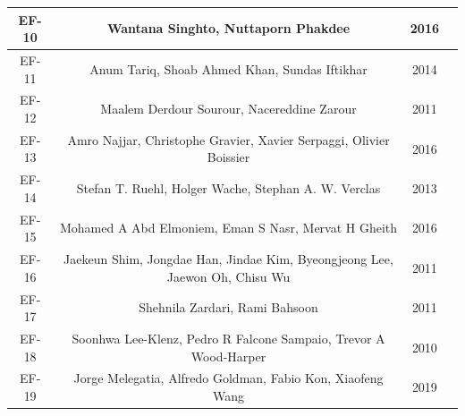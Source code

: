 \documentclass[conference,onecolumn,10pt]{IEEEtran}
\begin{document}
\begin{table}[!htbp]
{\begin{tabular}{c c c c}
                \hline 
                EF-10 & Wantana Singhto, Nuttaporn Phakdee & 2016 & \cite{EF-10} \\
                \hline
                EF-11 & Anum Tariq, Shoab Ahmed Khan, Sundas Iftikhar & 2014 & \cite{EF-11} \\
                \hline 
                EF-12 & Maalem Derdour Sourour, Nacereddine Zarour & 2011 & \cite{EF-12} \\
                \hline 
                EF-13 & Amro Najjar, Christophe Gravier, Xavier Serpaggi, Olivier Boissier & 2016 & \cite{EF-13} \\
                \hline 
                EF-14 & Stefan T. Ruehl, Holger Wache, Stephan A. W. Verclas & 2013 & \cite{EF-14} \\
                \hline 
                EF-15 & Mohamed A Abd Elmoniem, Eman S Nasr, Mervat H Gheith & 2016 & \cite{EF-15} \\
                \hline 
                EF-16 & Jaekeun Shim, Jongdae  Han, Jindae  Kim, Byeongjeong  Lee, Jaewon  Oh, Chisu  Wu  & 2011 & \cite{EF-16} \\
                \hline 
                EF-17 & Shehnila Zardari, Rami  Bahsoon & 2011 & \cite{EF-17} \\
                \hline 
                EF-18 & Soonhwa Lee-Klenz, Pedro R Falcone Sampaio, Trevor A Wood-Harper  & 2010 & \cite{EF-18} \\
                \hline 
                EF-19 & Jorge Melegatia, Alfredo Goldman, Fabio Kon, Xiaofeng Wang & 2019 & \cite{EF-19} \\
                \hline 
        \end{tabular}}
        \label{table:tablaterminos}
\end{table}
\end{document}

